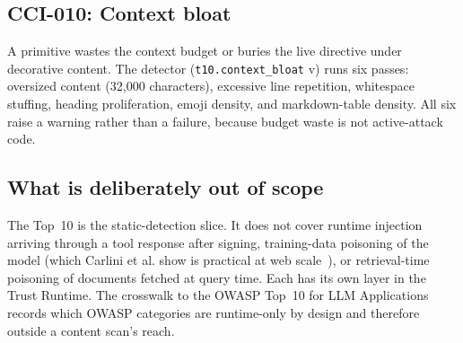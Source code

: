 \subsection{CCI-010: Context bloat}
A primitive wastes the context budget or buries the live directive under
decorative content. The detector (\texttt{t10.context\_bloat}
v\ttenver{}) runs six passes: oversized content (32{,}000 characters),
excessive line repetition, whitespace stuffing, heading proliferation,
emoji density, and markdown-table density. All six raise a warning
rather than a failure, because budget waste is not active-attack code.

\subsection{What is deliberately out of scope}
\label{subsec:not-in-taxonomy}
The Top~10 is the static-detection slice. It does not cover runtime
injection arriving through a tool response after signing, training-data
poisoning of the model (which Carlini et al. show is practical at web
scale~\cite{Carlini:2024:webcrawl-poisoning}), or retrieval-time
poisoning of documents fetched at query time. Each has its own layer in
the Trust Runtime. The crosswalk to the OWASP Top~10 for LLM
Applications~\cite{OWASP:2025:llm-top10} records which OWASP categories
are runtime-only by design and therefore outside a content scan's reach.

